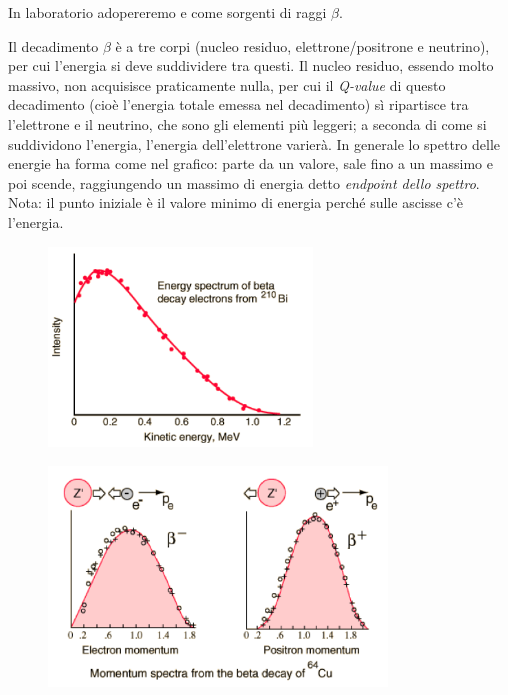 In laboratorio adopereremo  e  come sorgenti di raggi $\beta$.

\vspace{0.2cm}Il decadimento $\beta$ è a tre corpi (nucleo residuo, elettrone/positrone e neutrino), per cui l'energia si deve suddividere tra questi. Il nucleo residuo, essendo molto massivo, non acquisisce praticamente nulla, per cui il \textit{Q-value} di questo decadimento (cioè l'energia totale emessa nel decadimento) sì ripartisce tra l'elettrone e il neutrino, che sono gli elementi più leggeri; a seconda di come si suddividono l'energia, l'energia dell'elettrone varierà. In generale lo spettro delle energie ha forma come nel grafico: parte da un valore, sale fino a un massimo e poi scende, raggiungendo un massimo di energia detto \textit{endpoint dello spettro}. Nota: il punto iniziale è il valore minimo di energia perché sulle ascisse c'è l'energia.

\begin{minipage}{0.42\textwidth}
   \vspace{-0.9cm}\begin{figure}[H]
       \includegraphics[width=7cm]{immagini/spettro_decadimento_beta_1.png}
   \end{figure}
\end{minipage}
\begin{minipage}{0.5\textwidth}
   \begin{figure}[H]
       \includegraphics[width=9cm]{immagini/spettro_decadimento_beta_2.png}
   \end{figure}
\end{minipage}

